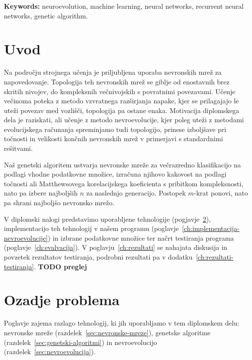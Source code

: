 \documentclass[a4paper,12pt,openright]{book}
\newcommand{\tkeywordsEn}{neuroevolution, machine learning, neural networks, recurrent neural networks, genetic algorithm}
\newcommand{\clearemptydoublepage}{\newpage{\pagestyle{empty}\cleardoublepage}}
\begin{document}
    \noindent\textbf{Keywords:} \tkeywordsEn.
    \clearemptydoublepage

    \mainmatter
    \setcounter{page}{1}
    \pagestyle{fancy}

    \chapter{Uvod}\label{ch:uvod}
    Na področju strojnega učenja je priljubljena uporaba nevronskih mrež za napovedovanje.
    Topologija teh nevronskih mrež se giblje od enostavnih brez skritih nivojev, do kompleksnih večnivojskih
    s povratnimi povezavami.
    Učenje večinoma poteka z metodo vzvratnega razširjanja napake, kjer se prilagajajo le uteži povezav med vozlišči,
    topologija pa ostane enaka.
    Motivacija diplomskega dela je raziskati, ali učenje z metodo nevroevolucije, kjer poleg uteži z metodami evolucijskega
    računanja spreminjamo tudi topologijo, prinese izboljšave pri točnosti in velikosti končnih nevronskih
    mrež v primerjavi s standardnimi rešitvami.

    Naš genetski algoritem ustvarja nevronske mreže za večrazredno klasifikacijo na podlagi vhodne
    podatkovne množice, izračuna njihovo kakovost na podlagi toč\-no\-sti ali Matthewsovega korelacijskega koeficienta s pribitkom kompleksnosti,
    nato pa izbere najboljših $n$ za naslednjo generacijo.
    Postopek $m$-krat ponovi, nato pa shrani najboljšo nevronsko mrežo.

    V diplomski nalogi predstavimo uporabljene tehnologije (pogjavje~\ref{ch:ozadje-problema}), implementacijo teh
    tehnologij v našem programu (poglavje~\ref{ch:implementacija-nevroevolucije}) in izbrane podatkovne množice ter
    načrt testiranja programa (poglavje~\ref{ch:evalvacija}).
    V poglavju~\ref{ch:rezultati} se nahajata diskusija in povzetek rezultatov testiranja, podrobni rezultati pa v dodatku~\ref{ch:rezultati-testiranja}.
    \textbf{TODO preglej}


    \chapter{Ozadje problema}\label{ch:ozadje-problema}
    Poglavje zajema razlago tehnologij, ki jih uporabljamo v tem diplomskem delu: nevronske mreže (razdelek~\ref{sec:nevronske-mreze}),
    genetske algoritme (razdelek~\ref{sec:genetski-algoritmi}) in nevroevolucijo (razdelek~\ref{sec:nevroevolucija}).
\end{document}
